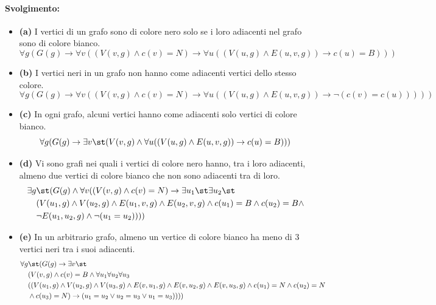 \paragraph{Svolgimento:}
\begin{itemize}
  \item \textbf{(a)} I vertici di un grafo sono di colore nero solo se i loro adiacenti nel grafo sono di colore bianco.
  \[\forall g(G(g) \rightarrow \forall v((V(v,g) \land c(v)=N) \rightarrow \forall u((V(u,g) \land E(u,v,g)) \rightarrow c(u)=B)))\]

  \item \textbf{(b)} I vertici neri in un grafo non hanno come adiacenti vertici dello stesso colore.
  \[\forall g(G(g) \rightarrow \forall v((V(v,g) \land c(v)=N) \rightarrow \forall u((V(u,g) \land E(u,v,g)) \rightarrow \neg(c(v)=c(u)))))\]

  \item \textbf{(c)} In ogni grafo, alcuni vertici hanno come adiacenti solo vertici di colore bianco.
  \[\forall g(G(g) \rightarrow \exists v\st (V(v,g) \land \forall u((V(u,g) \land E(u,v,g)) \rightarrow c(u)=B)))\]

  \item \textbf{(d)} Vi sono grafi nei quali i vertici di colore nero hanno, tra i loro adiacenti, almeno due vertici di colore bianco che non sono adiacenti tra di loro.
  \[
  \begin{aligned}    
    \exists g&\st (G(g) \land \forall v((V(v,g) \land c(v)=N) \rightarrow \exists u_1\st \exists u_2\st\\
    &(V(u_1,g) \land V(u_2,g) \land E(u_1,v,g) \land E(u_2,v,g) \land c(u_1)=B \land c(u_2)=B \land \\
    &\neg E(u_1,u_2,g) \land \neg(u_1=u_2))))
  \end{aligned}
  \]

  \item \textbf{(e)} In un arbitrario grafo, almeno un vertice di colore bianco ha meno di 3 vertici neri tra i suoi adiacenti.
  \[
  \begin{aligned}
    \forall g&\st (G(g) \rightarrow \exists v\st\\
    & (V(v,g) \land c(v)=B \land \forall u_1 \forall u_2 \forall u_3 \\
    &((V(u_1,g) \land V(u_2,g) \land V(u_3,g) \land E(v,u_1,g) \land E(v,u_2,g) \land E(v,u_3,g) \land c(u_1)=N \land c(u_2)=N \\
    & \land c(u_3)=N) \rightarrow (u_1=u_2 \lor u_2=u_3 \lor u_1=u_3))))
  \end{aligned}
  \]
\end{itemize}


